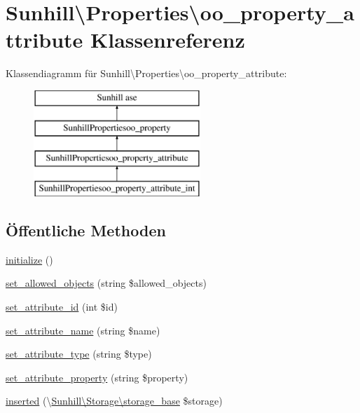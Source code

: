 \hypertarget{classSunhill_1_1Properties_1_1oo__property__attribute}{}\section{Sunhill\textbackslash{}Properties\textbackslash{}oo\+\_\+property\+\_\+attribute Klassenreferenz}
\label{classSunhill_1_1Properties_1_1oo__property__attribute}
Klassendiagramm für Sunhill\textbackslash{}Properties\textbackslash{}oo\+\_\+property\+\_\+attribute\+:\begin{figure}[H]
\begin{center}
\leavevmode
\includegraphics[height=4.000000cm]{d0/d51/classSunhill_1_1Properties_1_1oo__property__attribute}
\end{center}
\end{figure}
\subsection*{Öffentliche Methoden}
\begin{DoxyCompactItemize}
\item 
\hyperlink{classSunhill_1_1Properties_1_1oo__property__attribute_aa979e9a26755c6d66bde762f58be4a79}{initialize} ()
\item 
\hyperlink{classSunhill_1_1Properties_1_1oo__property__attribute_ae075e9a54555ad39b0afa704e9db3831}{set\+\_\+allowed\+\_\+objects} (string \$allowed\+\_\+objects)
\item 
\hyperlink{classSunhill_1_1Properties_1_1oo__property__attribute_a71867bef642580af3ac77775e91d1ca2}{set\+\_\+attribute\+\_\+id} (int \$id)
\item 
\hyperlink{classSunhill_1_1Properties_1_1oo__property__attribute_a5d6a5d990b336e98679c934dc00f4141}{set\+\_\+attribute\+\_\+name} (string \$name)
\item 
\hyperlink{classSunhill_1_1Properties_1_1oo__property__attribute_a60055c3386f40de65fb136fecbf70943}{set\+\_\+attribute\+\_\+type} (string \$type)
\item 
\hyperlink{classSunhill_1_1Properties_1_1oo__property__attribute_a12684add03158c97188a203279a78332}{set\+\_\+attribute\+\_\+property} (string \$property)
\item 
\hyperlink{classSunhill_1_1Properties_1_1oo__property__attribute_aa9b38f17f39e49b88d14d9b88a4cf8b1}{inserted} (\textbackslash{}\hyperlink{classSunhill_1_1Storage_1_1storage__base}{Sunhill\textbackslash{}\+Storage\textbackslash{}storage\+\_\+base} \$storage)
\end{DoxyCompactItemize}
